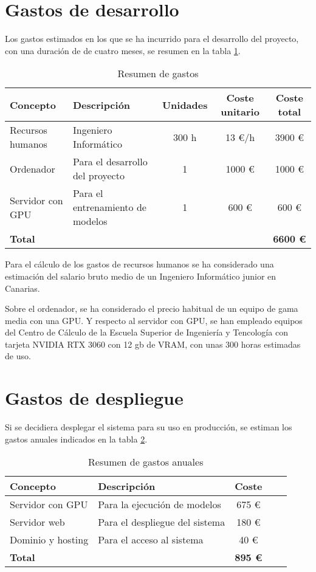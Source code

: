 \section{Gastos de desarrollo}
Los gastos estimados en los que se ha incurrido para el desarrollo del proyecto, con una duración de de cuatro meses,
 se resumen en la tabla \ref{tabla_presupuesto_desarrollo}. 

\begin{table}[h]
   \centering
   \small
   \caption{Resumen de gastos}
   \begin{tabular}{|l|l|c|c|c|}
      \hline
      \textbf{Concepto} & \textbf{Descripción} & \textbf{Unidades} & \textbf{Coste unitario} & \textbf{Coste total} \\ \hline
      Recursos humanos & Ingeniero Informático & 300 h & 13 €/h & 3900 € \\ \hline
      Ordenador & Para el desarrollo del proyecto & 1 & 1000 € & 1000 € \\ \hline
      Servidor con GPU & Para el entrenamiento de modelos & 1 & 600 € & 600 € \\ \hline
      \textbf{Total} & & & & \textbf{6600 €} \\ \hline
   \end{tabular}
   \label{tabla_presupuesto_desarrollo}
\end{table}

Para el cálculo de los gastos de recursos humanos se ha considerado una estimación del salario bruto medio de un Ingeniero Informático junior en Canarias.

Sobre el ordenador, se ha considerado el precio habitual de un equipo de gama media con una GPU. Y respecto al servidor con GPU, se han empleado equipos del 
Centro de Cálculo de la Escuela Superior de Ingeniería y Tencología con tarjeta NVIDIA RTX 3060 con 12 gb de VRAM, con unas 300 horas estimadas de uso.

\section{Gastos de despliegue}
Si se decidiera desplegar el sistema para su uso en producción, se estiman los gastos anuales indicados
en la tabla \ref{tabla_presupuesto_despliegue}.

\begin{table}[h]
   \centering
   \small
   \caption{Resumen de gastos anuales}
   \begin{tabular}{|l|l|c|c|c|}
      \hline
      \textbf{Concepto} & \textbf{Descripción} & \textbf{Coste} \\ \hline
      Servidor con GPU & Para la ejecución de modelos  & 675 € \\ \hline
      Servidor web & Para el despliegue del sistema  & 180 € \\ \hline
      Dominio y hosting & Para el acceso al sistema  & 40 € \\ \hline
      \textbf{Total}  & & \textbf{895 €} \\ \hline
   \end{tabular}
   \label{tabla_presupuesto_despliegue}
\end{table}

